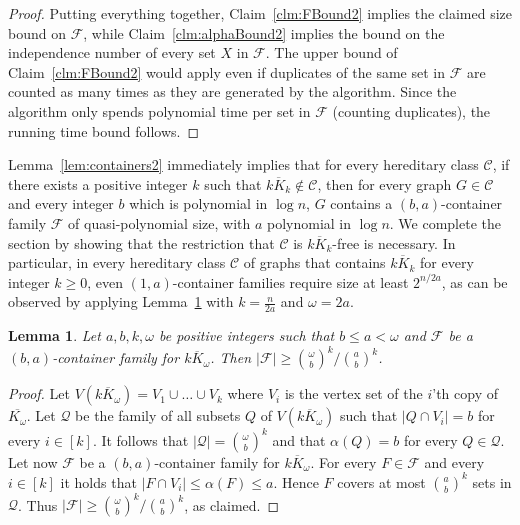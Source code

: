 \documentclass[11pt]{amsart}
\newtheorem{lemma}[theorem]{Lemma}
\newcommand{\cal}{\mathcal}
\begin{document}
\begin{proof}
Putting everything together, Claim~\ref{clm:FBound2} implies the claimed size bound on ${\cal F}$, while Claim~\ref{clm:alphaBound2} implies the bound on the independence number of every set $X$ in ${\cal F}$. 
%
The upper bound of Claim~\ref{clm:FBound2} would apply even if duplicates of the same set in ${\cal F}$ are counted as many times as they are generated by the algorithm. Since the algorithm only spends polynomial time per set in ${\cal F}$ (counting duplicates), the running time bound follows.    
\end{proof}

Lemma~\ref{lem:containers2} immediately implies that for every hereditary class ${\cal C}$, if there exists a positive integer $k$ such that $\overline{kK_k} \notin {\cal C}$, then for every graph $G \in {\cal C}$ and every integer $b$ which is polynomial in $\log n$, $G$ contains a $(b, a)$-container family ${\cal F}$ of quasi-polynomial size, with $a$ polynomial in $\log n$. 
%
We complete the section by showing that the restriction that  ${\cal C}$ is $\overline{kK_k}$-free is necessary. In particular, in every hereditary class ${\cal C}$ of graphs that contains $\overline{kK_k}$ for every integer $k \geq 0$, even $(1, a)$-container families require size at least $2^{n/2a}$, as can be observed by applying Lemma~\ref{lem:containerLowerBoundGraph} with $k = \frac{n}{2a}$ and $\omega = 2a$.

\begin{lemma}\label{lem:containerLowerBoundGraph}
Let $a, b, k, \omega$ be positive integers such that $b \leq a < \omega$ and ${\cal F}$ be a $(b, a)$-container family for $\overline{kK_\omega}$. Then 
$|{\cal F}| \geq {\omega \choose b}^k / {a \choose b}^k$.
\end{lemma}

\begin{proof}
Let $V(\overline{kK_\omega}) = V_1 \cup \ldots \cup V_k$ where $V_i$ is the vertex set of the $i$'th copy of 
$\overline{K_\omega}$.
%
Let ${\cal Q}$ be the family of all subsets $Q$ of $V(\overline{kK_\omega})$ such that $|Q \cap V_i| = b$ for every $i\in[k]$.
%
It follows that $|{\cal Q}| = {\omega \choose b}^k$ and that $\alpha(Q) = b$ for every $Q \in {\cal Q}$.
%
Let now ${\cal F}$ be a $(b, a)$-container family for $\overline{kK_\omega}$.
For every $F \in {\cal F}$ and every $i\in[k]$ it holds that $|F \cap V_i| \leq \alpha(F) \leq a$. Hence $F$ covers at most ${a \choose b}^k$ sets in ${\cal Q}$. 
%
Thus $|{\cal F}| \geq {\omega \choose b}^k / {a \choose b}^k$, as claimed. 
\end{proof}
\end{document}
